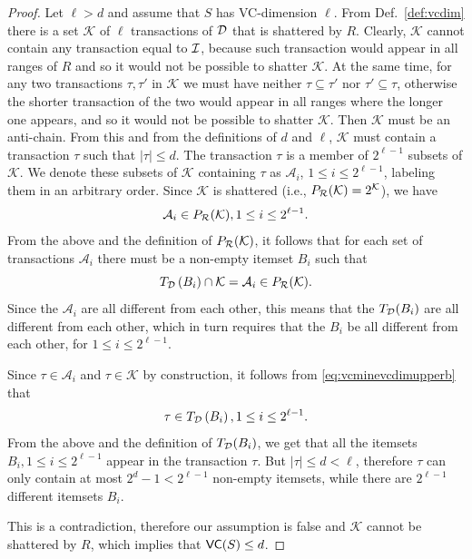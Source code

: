\begin{proof}
  Let $\ell>d$ and assume that $S$ has
  VC-dimension $\ell$. From Def.~\ref{def:vcdim} there is a set $\mathcal{K}$ of $\ell$
  transactions of ${\cal D}$ that is shattered by $R$. Clearly, $\mathcal{K}$ cannot
  contain any transaction equal to ${\cal I}$, because such transaction would appear
  in all ranges of $R$ and so it would not be possible to shatter $\mathcal{K}$.
  At the same time, for any two transactions $\tau,\tau'$ in
  $\mathcal{K}$ we must have neither $\tau\subseteq\tau'$ nor
  $\tau'\subseteq\tau$, otherwise the shorter transaction of the two would appear in
  all ranges where the longer one appears, and so it would not be possible to
  shatter $\mathcal{K}$. Then $\mathcal{K}$ must be an anti-chain. From this and
  from the definitions of $d$ and $\ell$, $\mathcal{K}$ must contain a
  transaction $\tau$ such that $|\tau|\le d$. %
  The transaction
  $\tau$ is a member of $2^{\ell-1}$ subsets of $\mathcal{K}$. We denote these subsets of $\mathcal{K}$ containing $\tau$ as
  $\mathcal{A}_i$, $1\le i\le 2^{\ell-1}$, labeling them in an
  arbitrary order. Since $\mathcal{K}$ is shattered (i.e., $P_{\mathcal{R}}(\mathcal{K})=2^\mathcal{K}$), we have
  \[ 
  \mathcal{A}_i\in P_{\mathcal{R}}(\mathcal{K}), 1\le i\le 2^{\ell -1}.
  \]
  From the above and the definition of $P_{\mathcal{R}}(\mathcal{K})$, it follows that for
  each set of transactions $\mathcal{A}_i$ there must be a
  non-empty itemset $B_i$ such that 
  \begin{equation}\label{eq:vcminevcdimupperb}
  T_{\cal D}\left(B_i\right)\cap \mathcal{K}= \mathcal{A}_i \in P_{\mathcal{R}}(\mathcal{K}).
  \end{equation}
  Since the $\mathcal{A}_i$ are all different from each other, this
  means that the $T_{\cal D}(B_i)$ are all different from each other, which
  in turn requires that the $B_i$ be all different from each other,
  for $1\le i\le 2^{\ell-1}$. 

  Since $\tau \in \mathcal{A}_i$ and $\tau \in \mathcal{K}$ by
  construction, it follows from \eqref{eq:vcminevcdimupperb} that 
  \[
  \tau \in T_{\cal D}\left(B_i\right), 1\le i\le 2^{\ell-1}.
  \]
  From the above and the definition of $T_{\cal D}(B_i)$, we get that all the
  itemsets $B_i, 1\le i\le 2^{\ell-1}$ appear in the transaction
  $\tau$. But $|\tau|\le d < \ell$, therefore $\tau$ can only contain at most $2^d-1 <
  2^{\ell -1}$ non-empty itemsets, while there are $2^{\ell-1}$ different
  itemsets $B_i$.

  This is a contradiction, therefore our assumption is false and
  $\mathcal{K}$ cannot be shattered by $R$, which implies that $\mathsf{VC}(S)\le d$.
\end{proof}

